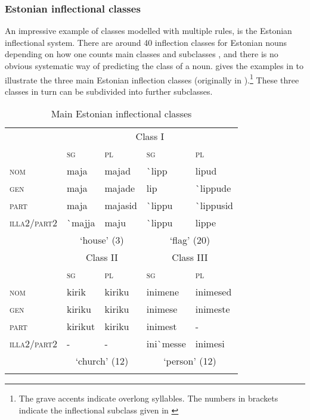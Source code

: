 \subsubsection{Estonian inflectional classes}

An impressive example of classes modelled with multiple rules, is the Estonian inflectional system. There are around 40 inflection classes for Estonian nouns depending on how one counts main classes and subclasses \autocites{Erelt.1995, Erelt.1997, Murk.1997, Blevins.2008}, and there is no obvious systematic way of predicting the class of a noun. \textcite[242]{Blevins.2008} gives the examples in  to illustrate the three main Estonian inflection classes (originally in \citealt{Erelt.2001}).\footnote{The grave accents indicate overlong syllables. The numbers in brackets indicate the inflectional subclass given in \autocite{Erelt.2001}} These three classes in turn can be subdivided into further subclasses.


\begin{table}
    \caption{Main Estonian inflectional classes}\label{tab:estonian-classes}
    \centering
    \begin{tabular}{lllll}
      \lsptoprule
      & \multicolumn{4}{c}{Class I}  \\

      & \textsc{sg}     & \textsc{pl} & \textsc{sg}  & \textsc{pl}          \\
      \midrule
      \textsc{nom}         & maja      & majad   & \`{}lipp  & lipud         \\
      \textsc{gen}         & maja      & majade  & lip       & \`{}lippude   \\
      \textsc{part}        & maja      & majasid & \`{}lippu & \`{}lippusid  \\
      \textsc{illa2/part2} & \`{}majja & maju    & \`{}lippu & lippe         \\
      \midrule
      & \multicolumn{2}{c}{`house' (3)} & \multicolumn{2}{c}{`flag' (20)}\\
      \midrule
      & \multicolumn{2}{c}{Class II} & \multicolumn{2}{c}{Class III}\\
      & \textsc{sg}     & \textsc{pl} & \textsc{sg}  & \textsc{pl}          \\
      \midrule
      \textsc{nom}         & kirik   & kiriku & inimene      & inimesed\\
      \textsc{gen}         & kiriku  & kiriku & inimese      & inimeste\\
      \textsc{part}        & kirikut & kiriku & inimest      & -       \\
      \textsc{illa2/part2} & -       & -      & ini\`{}messe & inimesi \\
      \midrule
       & \multicolumn{2}{c}{`church' (12)} & \multicolumn{2}{c}{`person' (12)} \\
      \lspbottomrule
  \end{tabular}
\end{table}

